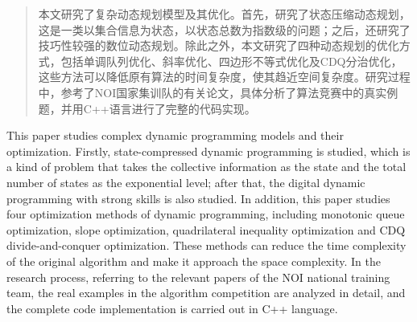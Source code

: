

\begin{abstract}

	本文研究了复杂动态规划模型及其优化。首先，研究了状态压缩动态规划，这是一类以集合信息为状态，以状态总数为指数级的问题；之后，还研究了技巧性较强的数位动态规划。除此之外，本文研究了四种动态规划的优化方式，包括单调队列优化、斜率优化、四边形不等式优化及CDQ分治优化，这些方法可以降低原有算法的时间复杂度，使其趋近空间复杂度。研究过程中，参考了NOI国家集训队的有关论文，具体分析了算法竞赛中的真实例题，并用C++语言\cite{2005C}进行了完整的代码实现。

\end{abstract}

\begin{abstract*}

	This paper studies complex dynamic programming models and their optimization. Firstly, state-compressed dynamic programming is studied, which is a kind of problem that takes the collective information as the state and the total number of states as the exponential level; after that, the digital dynamic programming with strong skills is also studied. In addition, this paper studies four optimization methods of dynamic programming, including monotonic queue optimization, slope optimization, quadrilateral inequality optimization and CDQ divide-and-conquer optimization. These methods can reduce the time complexity of the original algorithm and make it approach the space complexity. In the research process, referring to the relevant papers of the NOI national training team, the real examples in the algorithm competition are analyzed in detail, and the complete code implementation is carried out in C++ language.

\end{abstract*}
